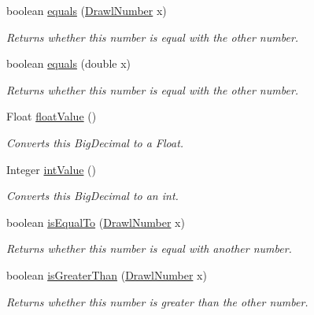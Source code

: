 \begin{DoxyCompactItemize}
boolean \hyperlink{classcom_1_1aarrelaakso_1_1drawl_1_1_drawl_number_a0b7c86770556d17d8de1b59b01d70d4e}{equals} (\hyperlink{classcom_1_1aarrelaakso_1_1drawl_1_1_drawl_number}{Drawl\+Number} x)
\begin{DoxyCompactList}\small\item\em Returns whether this number is equal with the other number. \end{DoxyCompactList}\item 
boolean \hyperlink{classcom_1_1aarrelaakso_1_1drawl_1_1_drawl_number_acd9190a42d7771c2bfe88725c4469274}{equals} (double x)
\begin{DoxyCompactList}\small\item\em Returns whether this number is equal with the other number. \end{DoxyCompactList}\item 
Float \hyperlink{classcom_1_1aarrelaakso_1_1drawl_1_1_drawl_number_ae8442cbd5cc7ab0c35c0302b196b3819}{float\+Value} ()
\begin{DoxyCompactList}\small\item\em Converts this Big\+Decimal to a Float. \end{DoxyCompactList}\item 
Integer \hyperlink{classcom_1_1aarrelaakso_1_1drawl_1_1_drawl_number_a8022d04415c5449344ac1e23658f8802}{int\+Value} ()
\begin{DoxyCompactList}\small\item\em Converts this Big\+Decimal to an int. \end{DoxyCompactList}\item 
boolean \hyperlink{classcom_1_1aarrelaakso_1_1drawl_1_1_drawl_number_af96bd123536cc6e868dae97f4184ad2c}{is\+Equal\+To} (\hyperlink{classcom_1_1aarrelaakso_1_1drawl_1_1_drawl_number}{Drawl\+Number} x)
\begin{DoxyCompactList}\small\item\em Returns whether this number is equal with another number. \end{DoxyCompactList}\item 
boolean \hyperlink{classcom_1_1aarrelaakso_1_1drawl_1_1_drawl_number_a5e5b8c8b62d256fc9d2a51491806bdf5}{is\+Greater\+Than} (\hyperlink{classcom_1_1aarrelaakso_1_1drawl_1_1_drawl_number}{Drawl\+Number} x)
\begin{DoxyCompactList}\small\item\em Returns whether this number is greater than the other number. \end{DoxyCompactList}\item 

\end{DoxyCompactItemize}
